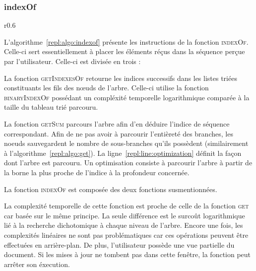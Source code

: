 \subsubsection{indexOf}
\label{repl:subsec:indexof}

\begin{wrapfigure}{r}{0.6\textwidth}
  \vspace{-35pt} %
  \begin{minipage}[t]{0.6\textwidth}
    \begin{algorithm}[H]
      
      \caption{\label{repl:algo:indexof} indexOf.}
    \end{algorithm}
  \end{minipage}
  \vspace{-15pt}
\end{wrapfigure}

L'algorithme~\ref{repl:algo:indexof} présente les instructions de la fonction
\textsc{indexOf}. Celle-ci sert essentiellement à placer les éléments réçus dans
la séquence perçue par l'utilisateur.  Celle-ci est divisée en trois :
\begin{inparaenum}[(i)]
\item La fonction \textsc{getIndexesOf} retourne les indices successifs dans les
  listes triées constituants les fils des nœuds de l'arbre. Celle-ci utilise la
  fonction \textsc{binaryIndexOf} possédant un compléxité temporelle
  logarithmique comparée à la taille du tableau trié parcouru.
\item La fonction \textsc{getSum} parcours l'arbre afin d'en déduire l'indice de
  séquence correspondant. Afin de ne pas avoir à parcourir l'entièreté des
  branches, les noeuds sauvegardent le nombre de sous-branches qu'ils possèdent
  (similairement à l'algorithme~\ref{repl:algo:get}).  La
  ligne~\ref{repl:line:optimization} définit la façon dont l'arbre est
  parcouru. Un optimisation consiste à parcourir l'arbre à partir de la borne la
  plus proche de l'indice à la profondeur concernée.
\item La fonction \textsc{indexOf} est composée des deux fonctions
  susmentionnées.
\end{inparaenum}


La complexité temporelle de cette fonction est proche de celle de la fonction
\textsc{get} car basée sur le même principe. La seule différence est le surcoût
logarithmique lié à la recherche dichotomique à chaque niveau de l'arbre. Encore
une fois, les complexités linéaires ne sont pas problématiques car ces
opérations peuvent être effectuées en arrière-plan. De plus, l'utilisateur
possède une vue partielle du document. Si les mises à jour ne tombent pas dans
cette fenêtre, la fonction peut arrêter son éxecution.


